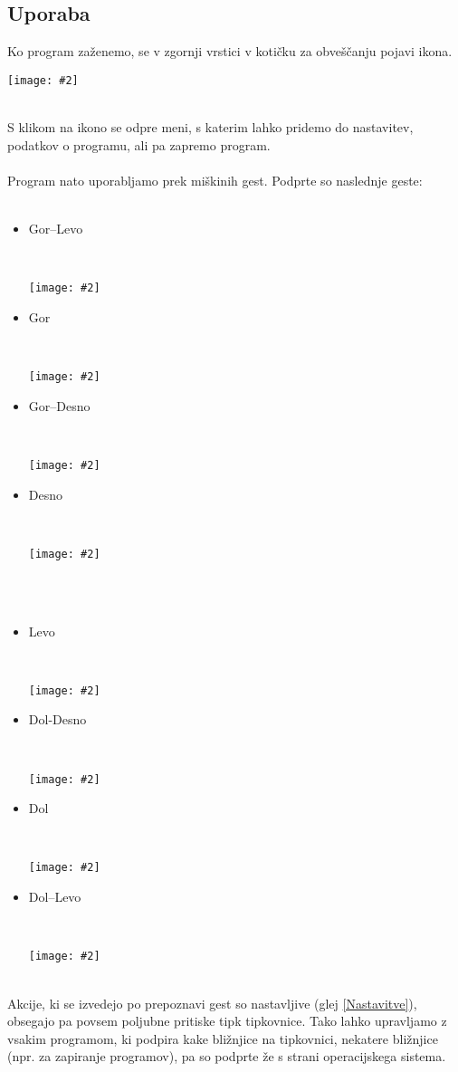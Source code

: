 \documentclass[10pt,a4paper,oneside]{book}
\newcommand\inline[1]{%
\begin{Sbox}{#1}\end{Sbox}%
\colorbox{lightgray}{\TheSbox}%
}
\newcommand\pic[2]{%
\parbox{1cm}{%
\begin{center}%
\texttt{[image: \#2]}%
\end{center}%
}%
}
\newcommand\br{%
 \ \\ \ \\%
}
\begin{document}
\subsection{Uporaba}
Ko program zaženemo, se v zgornji vrstici v kotičku za obveščanju pojavi ikona.\\
\pic{0.9}{./gmsAppindicator.png}\\
S klikom na ikono se odpre meni, s katerim lahko pridemo do nastavitev, podatkov o programu, ali pa zapremo program.
\br
Program nato uporabljamo prek miškinih gest. Podprte so naslednje geste:
\br
\begin{minipage}{6cm}
\begin{itemize}
\item \inline{Gor--Levo}\\
\pic{0.2}{./upleft.png}
\item \inline{Gor}\\
\pic{0.2}{./up.png}
\item \inline{Gor--Desno}\\
\pic{0.2}{./upright.png}
\end{itemize}
\end{minipage}
\begin{minipage}{6cm}
\begin{itemize}
\item \inline{Desno}\\
\pic{0.2}{./right.png}
\br
\item \inline{Levo}\\
\pic{0.2}{./left.png}
\end{itemize}
\end{minipage}
\begin{minipage}{6cm}
\begin{itemize}
\item \inline{Dol-Desno}\\
\pic{0.2}{./downright.png}
\item \inline{Dol}\\
\pic{0.2}{./down.png}
\item \inline{Dol--Levo}\\
\pic{0.2}{./downleft.png}
\end{itemize}
\end{minipage}\\
Akcije, ki se izvedejo po prepoznavi gest so nastavljive (glej \ref{Nastavitve}), obsegajo pa povsem poljubne pritiske tipk tipkovnice. Tako lahko upravljamo z vsakim programom, ki podpira kake bližnjice na tipkovnici, nekatere bližnjice (npr. za zapiranje programov), pa so podprte že s strani operacijskega sistema.
\newpage
\end{document}
